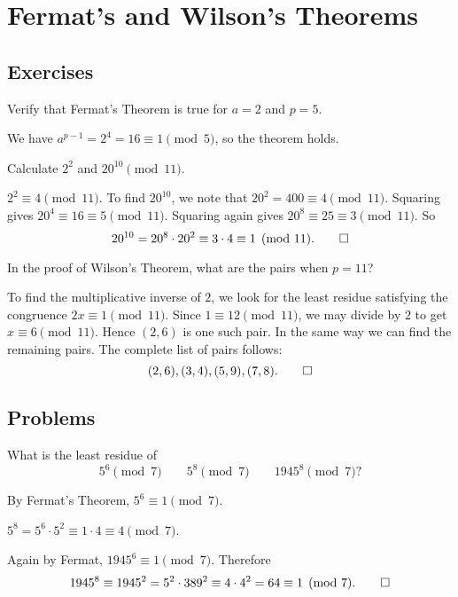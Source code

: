 \chapter{Fermat's and Wilson's Theorems}

\section{Exercises}

 Verify that Fermat's Theorem is true for $a = 2$ and $p = 5$.
\begin{solution}
  We have $a^{p-1} = 2^4 = 16 \equiv 1 \pmod 5$, so the theorem holds.
\end{solution}

 Calculate $2^2$ and $20^{10}\pmod{11}$.
\begin{solution}
  $2^2\equiv4\pmod{11}$. To find $20^{10}$, we note that
  $20^2 = 400 \equiv 4\pmod{11}$. Squaring gives
  $20^4\equiv16\equiv5\pmod{11}$. Squaring again gives
  $20^8\equiv25\equiv3\pmod{11}$. So
  \begin{equation*}
    20^{10} = 20^8\cdot20^2 \equiv 3\cdot4 \equiv 1 \pmod{11}.\qedhere
  \end{equation*}
\end{solution}

 In the proof of Wilson's Theorem, what are the pairs when
$p = 11$?
\begin{solution}
  To find the multiplicative inverse of $2$, we look for the least
  residue satisfying the congruence $2x\equiv1\pmod{11}$. Since
  $1\equiv12\pmod{11}$, we may divide by $2$ to get
  $x\equiv6\pmod{11}$. Hence $(2,6)$ is one such pair. In the same way
  we can find the remaining pairs. The complete list of pairs follows:
  \begin{equation*}
    (2,6), (3,4), (5,9), (7,8). \qedhere
  \end{equation*}
\end{solution}

\section{Problems}

 What is the least residue of
\begin{equation*}
  5^6\pmod7 \qquad 5^8\pmod7 \qquad 1945^8\pmod7?
\end{equation*}
\begin{solution}
  By Fermat's Theorem, $5^6\equiv1\pmod7$.

  $5^8 = 5^6\cdot5^2 \equiv 1\cdot4 \equiv 4\pmod7$.

  Again by Fermat, $1945^6\equiv1\pmod7$. Therefore
  \begin{equation*}
    1945^8\equiv1945^2
    = 5^2\cdot389^2 \equiv 4\cdot4^2 = 64\equiv1\pmod7.
    \qedhere
  \end{equation*}
\end{solution}

